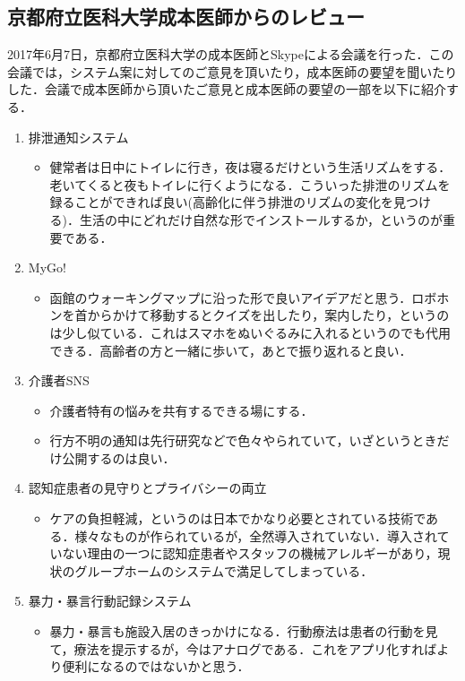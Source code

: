 \documentclass[../report]{subfiles}
\begin{document}
\subsection{京都府立医科大学成本医師からのレビュー}
2017年6月7日，京都府立医科大学の成本医師とSkypeによる会議を行った．この会議では，システム案に対してのご意見を頂いたり，成本医師の要望を聞いたりした．会議で成本医師から頂いたご意見と成本医師の要望の一部を以下に紹介する．
\begin{enumerate}
    \item 排泄通知システム
        \begin{itemize}
            \item 健常者は日中にトイレに行き，夜は寝るだけという生活リズムをする．老いてくると夜もトイレに行くようになる．こういった排泄のリズムを録ることができれば良い(高齢化に伴う排泄のリズムの変化を見つける)．生活の中にどれだけ自然な形でインストールするか，というのが重要である．
        \end{itemize}
    \item MyGo!
        \begin{itemize}
            \item 函館のウォーキングマップに沿った形で良いアイデアだと思う．ロボホンを首からかけて移動するとクイズを出したり，案内したり，というのは少し似ている．これはスマホをぬいぐるみに入れるというのでも代用できる．高齢者の方と一緒に歩いて，あとで振り返れると良い．
        \end{itemize}
    \item 介護者SNS
        \begin{itemize}
            \item 介護者特有の悩みを共有するできる場にする．
            \item 行方不明の通知は先行研究などで色々やられていて，いざというときだけ公開するのは良い．
        \end{itemize}
    \item 認知症患者の見守りとプライバシーの両立
        \begin{itemize}
            \item ケアの負担軽減，というのは日本でかなり必要とされている技術である．様々なものが作られているが，全然導入されていない．導入されていない理由の一つに認知症患者やスタッフの機械アレルギーがあり，現状のグループホームのシステムで満足してしまっている．
        \end{itemize}
    \item 暴力・暴言行動記録システム
        \begin{itemize}
            \item 暴力・暴言も施設入居のきっかけになる．行動療法は患者の行動を見て，療法を提示するが，今はアナログである．これをアプリ化すればより便利になるのではないかと思う．

\end{itemize}
\end{enumerate}
\end{document}
